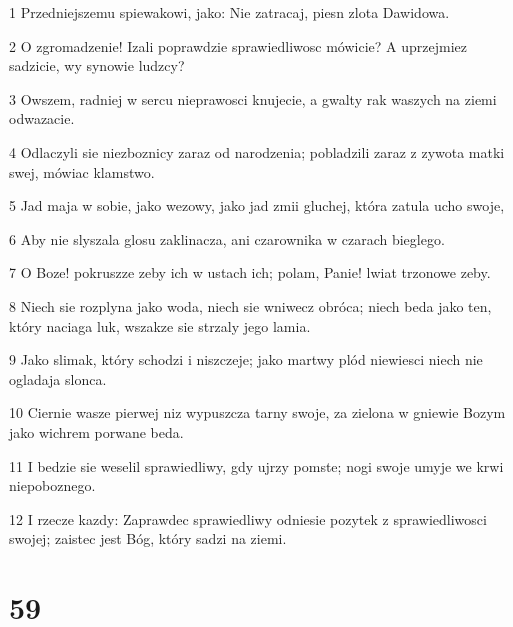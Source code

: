 \par 1 Przedniejszemu spiewakowi, jako: Nie zatracaj, piesn zlota Dawidowa.
\par 2 O zgromadzenie! Izali poprawdzie sprawiedliwosc mówicie? A uprzejmiez sadzicie, wy synowie ludzcy?
\par 3 Owszem, radniej w sercu nieprawosci knujecie, a gwalty rak waszych na ziemi odwazacie.
\par 4 Odlaczyli sie niezboznicy zaraz od narodzenia; pobladzili zaraz z zywota matki swej, mówiac klamstwo.
\par 5 Jad maja w sobie, jako wezowy, jako jad zmii gluchej, która zatula ucho swoje,
\par 6 Aby nie slyszala glosu zaklinacza, ani czarownika w czarach bieglego.
\par 7 O Boze! pokruszze zeby ich w ustach ich; polam, Panie! lwiat trzonowe zeby.
\par 8 Niech sie rozplyna jako woda, niech sie wniwecz obróca; niech beda jako ten, który naciaga luk, wszakze sie strzaly jego lamia.
\par 9 Jako slimak, który schodzi i niszczeje; jako martwy plód niewiesci niech nie ogladaja slonca.
\par 10 Ciernie wasze pierwej niz wypuszcza tarny swoje, za zielona w gniewie Bozym jako wichrem porwane beda.
\par 11 I bedzie sie weselil sprawiedliwy, gdy ujrzy pomste; nogi swoje umyje we krwi niepoboznego.
\par 12 I rzecze kazdy: Zaprawdec sprawiedliwy odniesie pozytek z sprawiedliwosci swojej; zaistec jest Bóg, który sadzi na ziemi.

\chapter{59}

